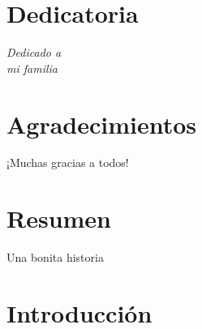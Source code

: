 \documentclass[12pt,a4paper]{book}
\begin{document}
\chapter*{Dedicatoria}

%
\begin{flushright}
\textit{Dedicado a \\
mi familia}
\end{flushright}

%
\chapter*{Agradecimientos} %

¡Muchas gracias a todos!

\chapter*{Resumen} %

%
Una bonita historia
%
%
%
\chapter{Introducción}

\end{document}
